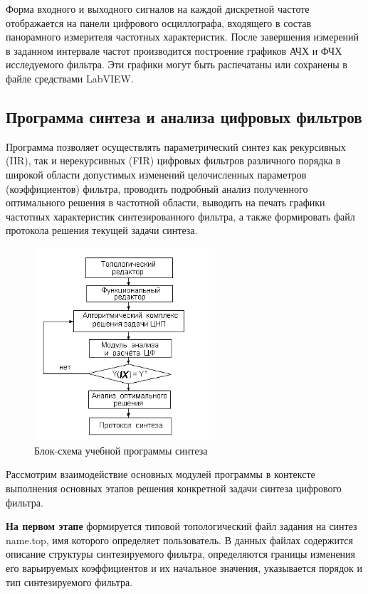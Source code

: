 Форма входного и выходного сигналов на каждой дискретной частоте отображается на панели цифрового осциллографа, входящего в состав панорамного измерителя частотных характеристик. После завершения измерений в заданном интервале частот производится построение графиков АЧХ и ФЧХ исследуемого фильтра. Эти графики могут быть распечатаны или сохранены в файле средствами LabVIEW.


\subsection{Программа синтеза и анализа цифровых фильтров}
Программа позволяет осуществлять параметрический синтез как рекурсивных (IIR), так и нерекурсивных (FIR) цифровых фильтров различного порядка в широкой области допустимых изменений целочисленных параметров (коэффициентов) фильтра, проводить подробный анализ полученного оптимального решения в частотной области, выводить на печать графики частотных характеристик синтезированного фильтра, а также формировать файл протокола решения текущей задачи синтеза. 
\begin{figure}[h!]
  \centering
  \includegraphics[width=0.6\textwidth]{imgs/img4}
  \caption{Блок-схема учебной программы синтеза}
  \label{fig:figure1}
\end{figure}
Рассмотрим взаимодействие основных модулей программы в контексте выполнения основных этапов решения конкретной задачи синтеза цифрового фильтра.

\textbf{На первом этапе} формируется типовой топологический файл задания на синтез  name.top, имя которого определяет пользователь. В данных файлах содержится описание структуры синтезируемого фильтра, определяются границы изменения его варьируемых коэффициентов и их начальное значения, указывается порядок и тип синтезируемого фильтра.

